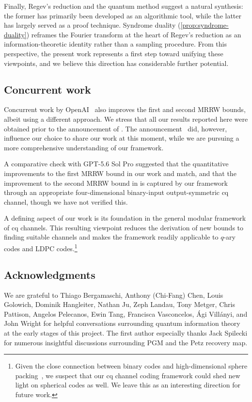 \documentclass[11pt]{article}
\theoremstyle{remark}
\begin{document}
Finally, Regev's reduction and the quantum method suggest a natural synthesis: the former has primarily been developed as an algorithmic tool, while the latter has largely served as a proof technique. Syndrome duality (\cref{prop:syndrome-duality}) reframes the Fourier transform at the heart of Regev's reduction as an information-theoretic identity rather than a sampling procedure. From this perspective, the present work represents a first step toward unifying these viewpoints, and we believe this direction has considerable further potential.

\subsection{Concurrent work}
\label{subsec:concurrent-work}

Concurrent work by OpenAI~\cite{Ope26} also improves the first and second MRRW bounds, albeit using a different approach. We stress that all our results reported here were obtained prior to the announcement of \cite{Ope26}. The announcement~\cite{Ope26} did, however, influence our choice to share our work at this moment, while we are pursuing a more comprehensive understanding of our framework.

A comparative check with GPT-5.6 Sol Pro suggested that the quantitative improvements to the first MRRW bound in our work and \cite{Ope26} match, and that the improvement to the second MRRW bound in \cite{Ope26} is captured by our framework through an appropriate four-dimensional binary-input output-symmetric cq channel, though we have not verified this.

A defining aspect of our work is its foundation in the general modular framework of cq channels. This resulting viewpoint reduces the derivation of new bounds to finding suitable channels and makes the framework readily applicable to $q$-ary codes and LDPC codes.\footnote{Given the close connection between binary codes and high-dimensional sphere packing~\cite{DGS77,KL78,CE03}, we suspect that our cq channel coding framework could shed new light on spherical codes as well. We leave this as an interesting direction for future work.}

\subsection{Acknowledgments}

We are grateful to Thiago Bergamaschi, Anthony (Chi-Fang) Chen, Louis Golowich, Dominik Hangleiter, Nathan Ju, Zeph Landau, Tony Metger, Chris Pattison, Angelos Pelecanos, Ewin Tang, Francisca Vasconcelos, \'Agi Vill\'anyi, and John Wright for helpful conversations surrounding quantum information theory at the early stages of this project. The first author especially thanks Jack Spilecki for numerous insightful discussions surrounding PGM and the Petz recovery map.
\end{document}
